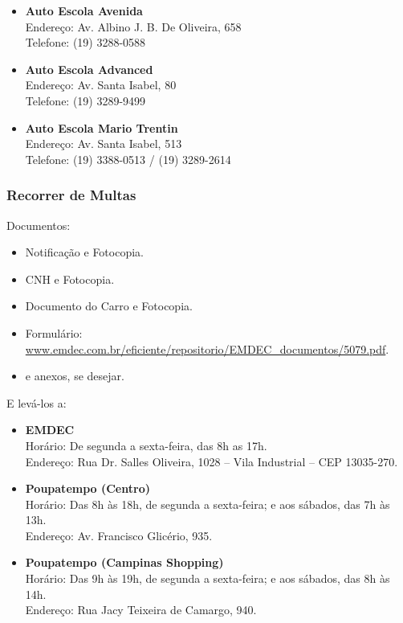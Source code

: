\begin{itemize}
    \item  \textbf{Auto Escola Avenida}
        \\Endereço: Av. Albino J. B. De Oliveira, 658
        \\Telefone: (19) 3288-0588

    \item  \textbf{Auto Escola Advanced}
        \\Endereço: Av. Santa Isabel, 80
        \\Telefone: (19) 3289-9499

    \item  \textbf{Auto Escola Mario Trentin}
        \\Endereço: Av. Santa Isabel, 513
        \\Telefone: (19) 3388-0513 / (19) 3289-2614
\end{itemize}

\subsubsection*{Recorrer de Multas}

Documentos:
\begin{itemize}
    \item  Notificação e Fotocopia.
    \item  CNH e Fotocopia.
    \item  Documento do Carro e Fotocopia.
    \item  Formulário: \url{www.emdec.com.br/eficiente/repositorio/EMDEC_documentos/5079.pdf}.
    \item  e anexos, se desejar.
\end{itemize}

E levá-los a:
\begin{itemize}
    \item   \textbf{EMDEC}
        \\Horário: De segunda a sexta-feira, das 8h as 17h.
        \\Endereço: Rua Dr. Salles Oliveira, 1028 -- Vila Industrial -- CEP 13035-270.
    \item   \textbf{Poupatempo (Centro)}
        \\Horário: Das 8h às 18h, de segunda a sexta-feira; e aos sábados, das 7h às 13h.
        \\Endereço: Av. Francisco Glicério, 935.
    \item   \textbf{Poupatempo (Campinas Shopping)}
        \\Horário: Das 9h às 19h, de segunda a sexta-feira; e aos sábados, das 8h às 14h.
        \\Endereço: Rua Jacy Teixeira de Camargo, 940.
\end{itemize}

